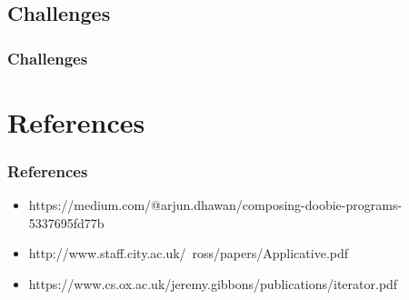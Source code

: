 \documentclass{beamer}
\begin{document}
\subsection{Challenges}
\begin{frame}
  \frametitle{Challenges}
\end{frame}

\section{References}
\begin{frame}
  \frametitle{References}
  \begin{itemize}
  \item https://medium.com/@arjun.dhawan/composing-doobie-programs-5337695fd77b
  \item http://www.staff.city.ac.uk/~ross/papers/Applicative.pdf
  \item https://www.cs.ox.ac.uk/jeremy.gibbons/publications/iterator.pdf
  \end{itemize}
\end{frame}
\begin{frame}
  
  
\end{frame}
\end{document}
